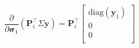 \begin{equation}
\frac{\partial}{\partial \boldsymbol{\sigma}_1}\left(\mathbf{P}_i^\top\Sigma\mathbf{y}\right)
=
\mathbf{P}_i^\top
\left[
    \begin{matrix}
        \text{diag}(\mathbf{y}_1)\\
        0\\
        0\\
    \end{matrix}
\right]
\end{equation}
